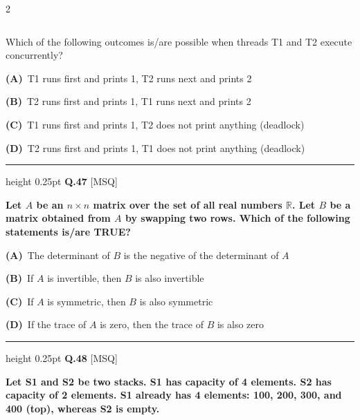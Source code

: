 \documentclass[a4paper,10pt,twoside]{article}
\begin{document}
\begin{multicols}{2}
{\begin{verbatim}
\end{verbatim}
Which of the following outcomes is/are possible when threads T1 and T2 execute concurrently? \par}
\par\vspace{2pt}\noindent
\textbf{(A)}~T1 runs first and prints 1, T2 runs next and prints 2\par\vspace{2pt}\noindent
\textbf{(B)}~T2 runs first and prints 1, T1 runs next and prints 2\par\vspace{2pt}\noindent
\textbf{(C)}~T1 runs first and prints 1, T2 does not print anything (deadlock)\par\vspace{2pt}\noindent
\textbf{(D)}~T2 runs first and prints 1, T1 does not print anything (deadlock)
\par\vspace{6pt}\hrule height 0.25pt\vspace{6pt}
\noindent\textbf{Q.47} \hfill {\footnotesize\textsf{[MSQ]}}
\par\vspace{2pt}
{\bfseries Let $A$ be an $n \times n$ matrix over the set of all real numbers $\mathbb{R}$. Let $B$ be a matrix obtained from $A$ by swapping two rows. Which of the following statements is/are TRUE? \par}
\par\vspace{2pt}\noindent
\textbf{(A)}~The determinant of $B$ is the negative of the determinant of $A$\par\vspace{2pt}\noindent
\textbf{(B)}~If $A$ is invertible, then $B$ is also invertible\par\vspace{2pt}\noindent
\textbf{(C)}~If $A$ is symmetric, then $B$ is also symmetric\par\vspace{2pt}\noindent
\textbf{(D)}~If the trace of $A$ is zero, then the trace of $B$ is also zero
\par\vspace{6pt}\hrule height 0.25pt\vspace{6pt}
\noindent\textbf{Q.48} \hfill {\footnotesize\textsf{[MSQ]}}
\par\vspace{2pt}
{\bfseries Let S1 and S2 be two stacks. S1 has capacity of 4 elements. S2 has capacity of 2 elements. S1 already has 4 elements: 100, 200, 300, and 400 (top), whereas S2 is empty.
}
\end{multicols}
\end{document}
